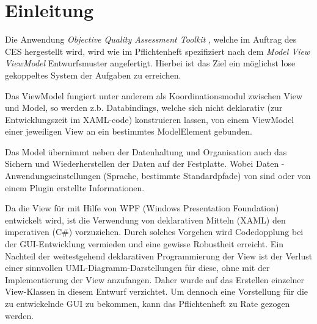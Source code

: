 \chapter{Einleitung}

Die Anwendung \emph{Objective Quality Assessment Toolkit} , welche im Auftrag des CES hergestellt wird, wird wie im Pflichtenheft spezifiziert nach dem \emph{Model View ViewModel} Entwurfsmuster angefertigt.
Hierbei ist das Ziel ein möglichst lose gekoppeltes System der Aufgaben zu erreichen.

Das ViewModel fungiert unter anderem als Koordinationsmodul
zwischen View und Model, so werden z.b. Databindings, welche
sich nicht deklarativ (zur Entwicklungszeit im XAML-code)
konstruieren lassen, von einem ViewModel einer jeweiligen View
an ein bestimmtes ModelElement gebunden.

Das Model übernimmt neben der Datenhaltung und Organisation
auch das Sichern und Wiederherstellen der Daten auf der Festplatte.
Wobei Daten \projektTitel-Anwendungseinstellungen (Sprache, bestimmte
Standardpfade) von \projektTitel sind oder von einem Plugin erstellte Informationen.

Da die View für \projektTitel mit Hilfe von WPF (Windows Presentation Foundation) entwickelt 
wird, ist die Verwendung von deklarativen Mitteln (XAML) den
imperativen (C\#) vorzuziehen. Durch solches Vorgehen wird
Codedopplung bei der GUI-Entwicklung vermieden und eine
gewisse Robustheit erreicht. Ein Nachteil der weitestgehend deklarativen
Programmierung der View ist der Verlust einer sinnvollen
UML-Diagramm-Darstellungen für diese, ohne mit der Implementierung 
der View anzufangen. Daher wurde auf das Erstellen einzelner View-Klassen in diesem Entwurf
verzichtet. Um dennoch eine Vorstellung für die zu entwickelnde GUI 
zu bekommen, kann das Pflichtenheft zu Rate gezogen werden.
